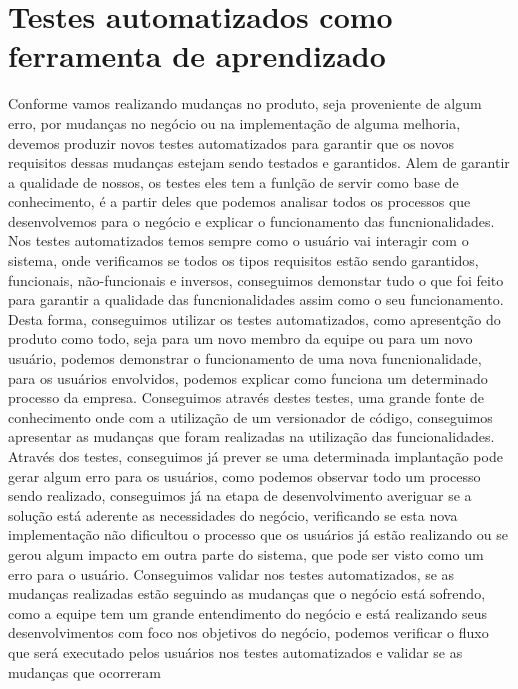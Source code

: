     \section{Testes automatizados como ferramenta de aprendizado}
      Conforme vamos realizando mudanças no produto, seja proveniente de algum erro,
      por mudanças no negócio ou na implementação de alguma melhoria, devemos produzir
      novos testes automatizados para garantir que os novos requisitos dessas mudanças
      estejam sendo testados e garantidos. \newline
      Alem de garantir a qualidade de nossos, os testes eles tem a funlção de servir
      como base de conhecimento, é a partir deles que podemos analisar todos os
      processos que desenvolvemos para o negócio e explicar o funcionamento das
      funcnionalidades. Nos testes automatizados temos sempre como o usuário vai
      interagir com o sistema, onde verificamos se todos os tipos requisitos estão
      sendo garantidos, funcionais, não-funcionais e inversos, conseguimos demonstar
      tudo o que foi feito para garantir a qualidade das funcnionalidades assim
      como o seu funcionamento. Desta forma, conseguimos utilizar os testes automatizados,
      como apresentção do produto como todo, seja para um novo membro da equipe ou
      para um novo usuário, podemos demonstrar o funcionamento de uma nova funcnionalidade,
      para os usuários envolvidos, podemos explicar como funciona um determinado
      processo da empresa. Conseguimos através destes testes, uma grande fonte de
      conhecimento onde com a utilização de um versionador de código, conseguimos
      apresentar as mudanças que foram realizadas na utilização das funcionalidades.
      Através dos testes, conseguimos já prever se uma determinada implantação pode
      gerar algum erro para os usuários, como podemos observar todo um processo sendo
      realizado, conseguimos já na etapa de desenvolvimento averiguar se a solução
      está aderente as necessidades do negócio, verificando se esta nova implementação
      não dificultou o processo que os usuários já estão realizando ou se gerou algum
      impacto em outra parte do sistema, que pode ser visto como um erro para o
      usuário. Conseguimos validar nos testes automatizados, se as mudanças realizadas
      estão seguindo as mudanças que o negócio está sofrendo, como a equipe tem um
      grande entendimento do negócio e está realizando seus desenvolvimentos com
      foco nos objetivos do negócio, podemos verificar o fluxo que será executado
      pelos usuários nos testes automatizados e validar se as mudanças que ocorreram
